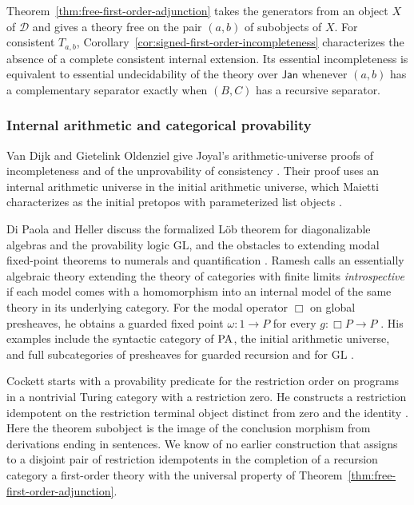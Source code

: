 Theorem~\ref{thm:free-first-order-adjunction} takes the generators
from an object $X$ of $\mathcal D$ and gives a theory free on the
pair $(a,b)$ of subobjects of $X$. For consistent $T_{a,b}$,
Corollary~\ref{cor:signed-first-order-incompleteness} characterizes the absence
of a complete consistent internal extension. Its essential incompleteness
is equivalent to essential undecidability of the theory over $\mathsf{Jan}$
whenever $(a,b)$ has a complementary separator exactly when $(B,C)$
has a recursive separator.

\subsubsection{Internal arithmetic and categorical provability}

Van Dijk and Gietelink Oldenziel give Joyal's arithmetic-universe
proofs of incompleteness and of the unprovability of consistency
\cite[Theorems~5.19--5.20]{vanDijkGO}. Their proof uses an internal
arithmetic universe in the initial arithmetic universe, which Maietti
characterizes as the initial pretopos with parameterized list objects
\cite[Definition~2.6 and Theorem~6.3]{MaiettiLists}.

Di Paola and Heller discuss the formalized L\"ob theorem for diagonalizable
algebras and the provability logic $\mathrm{GL}$, and the obstacles to
extending modal fixed-point theorems to numerals and quantification
\cite[pp.~595--596]{DPH}. Ramesh calls an essentially algebraic theory
extending the theory of categories with finite limits \emph{introspective}
if each model comes with a homomorphism into an internal model of the same
theory in its underlying category. For the modal operator $\Box$ on global
presheaves, he obtains a guarded fixed point $\omega:1\to P$ for every
$g:\Box P\to P$ \cite[Definition~2.7, p.~48, and Theorem~4.19, p.~82]{Ramesh2023}.
His examples include the syntactic category of $\mathrm{PA}$, the initial arithmetic
universe, and full subcategories of presheaves for guarded recursion and for
$\mathrm{GL}$ \cite[Sections~2.4 and 6.4]{Ramesh2023}.

Cockett starts with a provability predicate for the restriction order on
programs in a nontrivial Turing category with a restriction zero. He
constructs a restriction idempotent on the restriction terminal object
distinct from zero and the identity
\cite[Section~7.5, Theorem~7.14]{CockettComputability}. Here the theorem
subobject is the image of the conclusion morphism from derivations ending
in sentences. We know of no earlier construction that assigns to a disjoint
pair of restriction idempotents in the completion of a recursion category
a first-order theory with the universal property of
Theorem~\ref{thm:free-first-order-adjunction}.

